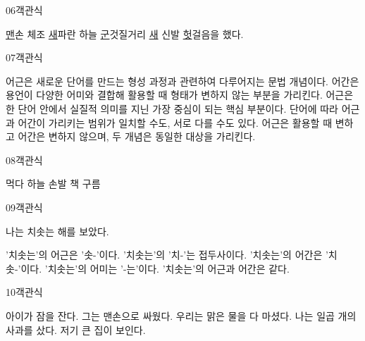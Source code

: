 \documentclass[fs9,seriesRus]{korfarm-base}
\begin{document}
\begin{kfQBlock}{06}{객관식}
\begin{kfChoices}
\kfChoice \uline{맨}손 체조
\kfChoice \uline{새}파란 하늘
\kfChoice \uline{군}것질거리
\kfChoice \uline{새} 신발
\kfChoice \uline{헛}걸음을 했다.
\end{kfChoices}
\end{kfQBlock}
\begin{kfQBlock}{07}{객관식}
\begin{kfChoices}
\kfChoice 어근은 새로운 단어를 만드는 형성 과정과 관련하여 다루어지는 문법 개념이다.
\kfChoice 어간은 용언이 다양한 어미와 결합해 활용할 때 형태가 변하지 않는 부분을 가리킨다.
\kfChoice 어근은 한 단어 안에서 실질적 의미를 지닌 가장 중심이 되는 핵심 부분이다.
\kfChoice 단어에 따라 어근과 어간이 가리키는 범위가 일치할 수도, 서로 다를 수도 있다.
\kfChoice 어근은 활용할 때 변하고 어간은 변하지 않으며, 두 개념은 동일한 대상을 가리킨다.
\end{kfChoices}
\end{kfQBlock}
\begin{kfQBlock}{08}{객관식}
\begin{kfChoices}
\kfChoice 먹다
\kfChoice 하늘
\kfChoice 손발
\kfChoice 책
\kfChoice 구름
\end{kfChoices}
\end{kfQBlock}
\begin{kfQBlock}{09}{객관식}
\begin{kfEvidence}나는 치솟는 해를 보았다.\end{kfEvidence}
\begin{kfChoices}
\kfChoice '치솟는'의 어근은 '솟-'이다.
\kfChoice '치솟는'의 '치-'는 접두사이다.
\kfChoice '치솟는'의 어간은 '치솟-'이다.
\kfChoice '치솟는'의 어미는 '-는'이다.
\kfChoice '치솟는'의 어근과 어간은 같다.
\end{kfChoices}
\end{kfQBlock}
\begin{kfQBlock}{10}{객관식}
\begin{kfChoices}
\kfChoice 아이가 잠을 잔다.
\kfChoice 그는 맨손으로 싸웠다.
\kfChoice 우리는 맑은 물을 다 마셨다.
\kfChoice 나는 일곱 개의 사과를 샀다.
\kfChoice 저기 큰 집이 보인다.
\end{kfChoices}
\end{kfQBlock}
\end{document}
